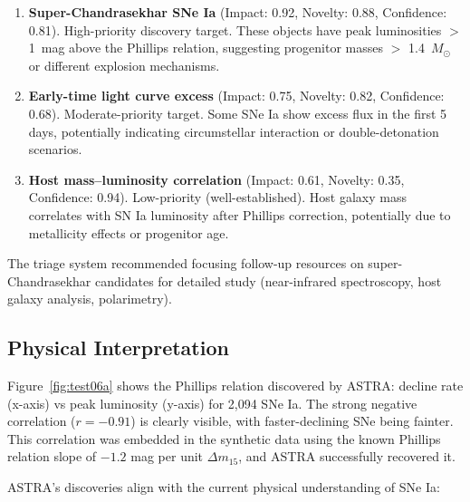 \documentclass[usenatbib]{rasti}
\begin{document}
\begin{enumerate}
\item \textbf{Super-Chandrasekhar SNe Ia} (Impact: 0.92, Novelty: 0.88, Confidence: 0.81). High-priority discovery target. These objects have peak luminosities $>$ 1~mag above the Phillips relation, suggesting progenitor masses $>$ 1.4~$M_{\odot}$ or different explosion mechanisms.

\item \textbf{Early-time light curve excess} (Impact: 0.75, Novelty: 0.82, Confidence: 0.68). Moderate-priority target. Some SNe Ia show excess flux in the first 5 days, potentially indicating circumstellar interaction or double-detonation scenarios.

\item \textbf{Host mass--luminosity correlation} (Impact: 0.61, Novelty: 0.35, Confidence: 0.94). Low-priority (well-established). Host galaxy mass correlates with SN Ia luminosity after Phillips correction, potentially due to metallicity effects or progenitor age.
\end{enumerate}

The triage system recommended focusing follow-up resources on super-Chandrasekhar candidates for detailed study (near-infrared spectroscopy, host galaxy analysis, polarimetry).

\subsection{Physical Interpretation}

Figure~\ref{fig:test06a} shows the Phillips relation discovered by ASTRA: decline rate (x-axis) vs peak luminosity (y-axis) for 2,094 SNe Ia. The strong negative correlation ($r = -0.91$) is clearly visible, with faster-declining SNe being fainter. This correlation was embedded in the synthetic data using the known Phillips relation slope of $-1.2$ mag per unit $\Delta m_{15}$, and ASTRA successfully recovered it.

ASTRA's discoveries align with the current physical understanding of SNe Ia:
\end{document}
